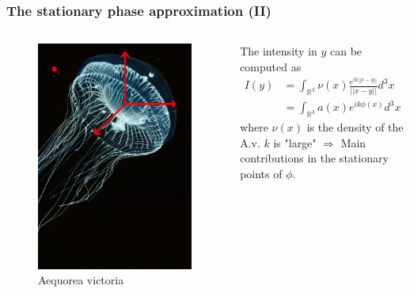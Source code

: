 \documentclass{beamer}
\begin{document}
\begin{frame}
\frametitle{The stationary phase approximation (II)}
\begin{columns}[c]
\begin{figure}
\includegraphics[width=0.75\linewidth]{medusatot}
\caption{Aequorea victoria}
\end{figure}

The intensity in $y$ can be computed as
\[
\begin{split}
I(y)&=\int_{\mathbb R^3}\nu(x)\frac{e^{ik||x-y||}}{||x-y||}d^3x\\
&=\int_{\mathbb R^3}a(x)e^{ik\phi(x)}d^3x
\end{split}
\]
where $\nu(x)$ is the density of the A.v.\newline
$k$ is "large" $\Rightarrow$ Main contributions in the stationary points of $\phi$.
\end{columns}
\end{frame}

\end{document}
